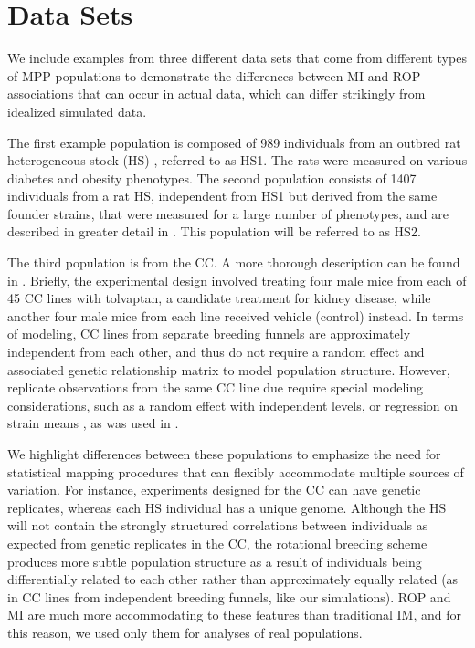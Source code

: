 \section{Data Sets}

We include examples from three different data sets that come from different types of MPP populations to demonstrate the differences between MI and ROP associations that can occur in actual data, which can differ strikingly from idealized simulated data.

The first example population is composed of 989 individuals from an outbred rat heterogeneous stock (HS) \citep{SolbergWoods2012,Keele2017}, referred to as HS1. The rats were measured on various diabetes and obesity phenotypes. The second population consists of 1407 individuals from a rat HS, independent from HS1 but derived from the same founder strains, that were measured for a large number of phenotypes, and are described in greater detail in \cite{Baud2013, Baud2014}. This population will be referred to as HS2.

The third population is from the CC. A more thorough description can be found in \cite{Mosedale2017}. Briefly, the experimental design involved treating four male mice from each of 45 CC lines with tolvaptan, a candidate treatment for kidney disease, while another four male mice from each line received vehicle (control) instead. In terms of modeling, CC lines from separate breeding funnels are approximately independent from each other, and thus do not require a random effect and associated genetic relationship matrix to model population structure. However, replicate observations from the same CC line due require special modeling considerations, such as a random effect with independent levels, or regression on strain means \citep{Zou2006}, as was used in \cite{Mosedale2017}. 

We highlight differences between these populations to emphasize the need for statistical mapping procedures that can flexibly accommodate multiple sources of variation. For instance, experiments designed for the CC can have genetic replicates, whereas each HS individual has a unique genome. Although the HS will not contain the strongly structured correlations between individuals as expected from genetic replicates in the CC, the rotational breeding scheme produces more subtle population structure as a result of individuals being differentially related to each other rather than approximately equally related (as in CC lines from independent breeding funnels, like our simulations). ROP and MI are much more accommodating to these features than traditional IM, and for this reason, we used only them for analyses of real populations.

